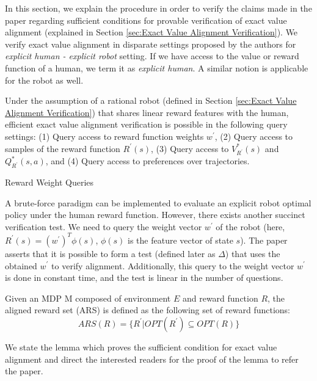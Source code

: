 In this section, we explain the procedure in order to verify the claims made in the paper regarding sufficient conditions for provable verification of exact value alignment (explained in Section \ref{sec:Exact Value Alignment Verification}). We verify exact value alignment in disparate settings proposed by the authors for \textit{explicit human - explicit robot} setting. If we have access to the value or reward function of a human, we term it as \textit{explicit human}. A similar notion is applicable for the robot as well.
\begin{thm}
Under the assumption of a rational robot (defined in Section \ref{sec:Exact Value Alignment Verification}) that shares linear reward features with the human, efficient exact value alignment verification is possible in the following query settings: (1) Query access to reward function weights $w^{'}$, (2) Query access to samples of the reward function $R^{'}(s)$, (3) Query access to $V^{*}_{R^{'}}(s)$ and $Q^{*}_{R^{'}}(s,a)$, and (4) Query access to preferences over trajectories.
\end{thm}

\begin{case}
\label{case:Reward Weight Queries}
Reward Weight Queries
\end{case} 
A brute-force paradigm can be implemented to evaluate an explicit robot optimal policy under the human reward function. However, there exists another succinct verification test. We need to query the weight vector $w^{'}$ of the robot (here, $R^{'}(s) = (w^{'})^{T} \phi(s)$, $\phi(s)$ is the feature vector of state $s$). The paper asserts that it is possible to form a test (defined later as $\Delta$) that uses the obtained $w^{'}$ to verify alignment. Additionally, this query to the weight vector $w^{'}$ is done in constant time, and the test is linear in the number of questions.

\begin{defn}
    Given an MDP M composed of environment $E$ and reward function $R$, the aligned reward set (ARS) is defined as the following set of reward functions:
    \[
        ARS(R) = \{R^{'} | OPT(R^{'}) \subseteq OPT(R)\}
    \]
\end{defn}
We state the lemma which proves the sufficient condition for exact value alignment and direct the interested readers for the proof of the lemma to refer the paper.


